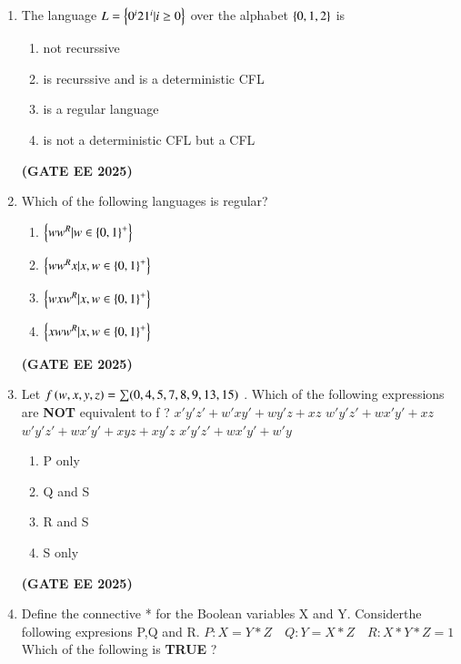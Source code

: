 \documentclass[journal,12pt,onecolumn]{IEEEtran}
\theoremstyle{remark}
\begin{document}
\begin {center}
\begin{enumerate}
    \item The language $L= \left\{0^i 2 1^i| i\geq0\right\}$ over the alphabet $\left\{0,1,2\right\}$ is 
    \begin{enumerate}
        \item not recurssive 
        \item is recurssive and is a deterministic CFL
        \item is a regular language
        \item is not a deterministic CFL but a CFL
    \end{enumerate}
    \hfill \textbf{(GATE EE 2025)}
    \item Which of the following languages is regular?
    \begin{enumerate}
        \item $\left\{ww^R |w \in {\ensuremath{\left\{0,1\right\}}}^+\right\}$
        \item $\left\{ww^R x |x,w \in {\ensuremath{\left\{0,1\right\}}}^+\right\}$
        \item $\left\{wxw^R |x,w \in {\ensuremath{\left\{0,1\right\}}}^+\right\}$
        \item $\left\{xww^R |x,w \in {\ensuremath{\left\{0,1\right\}}}^+\right\}$
    \end{enumerate}
    \hfill \textbf{(GATE EE 2025)}
    \item Let $f\left(w,x,y,z\right)=\sum (0,4,5,7,8,9,13,15)$ . Which of the following expressions are \textbf{NOT} equivalent to f ?
    \newline
     $ x'y'z' +w'xy' +wy'z+xz$
    \newline
    $w'y'z'+ wx'y'+xz$
    \newline
     $w'y'z' +wx'y' +xyz +xy'z$
    \newline
    $x'y'z' +wx'y' +w'y$
\begin{enumerate}
    \item P only
    \item Q and S 
    \item R and S
    \item S only
\end{enumerate}    
\hfill \textbf{(GATE EE 2025)}
    \item Define the connective * for the Boolean variables X and Y. Considerthe following expresions P,Q and R.
    \newline 
    $P: X=Y*Z \quad  Q:Y=X*Z \quad R:X*Y*Z=1$
    \newline
    Which of the following is \textbf{TRUE} ?
    \begin{enumerate}
    \begin{multicols}{2}
        

\end{multicols}
\end{enumerate}
\end{enumerate}
\end{center}
\end{document}
